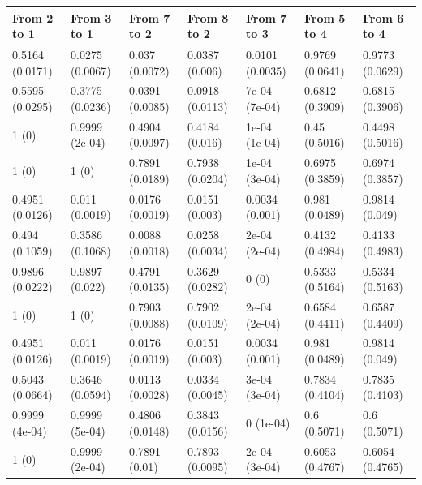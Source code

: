 \documentclass{report}
\begin{document}
\begin{table}[!ht]
	\raggedleft
	\footnotesize
	\begin{tabular}{|l|l|l|l|l|l|l|}
		\arrayrulecolor{black}
		\hline
		\textbf{From 2 to 1} & \textbf{From 3 to 1} & \textbf{From 7 to 2} & \textbf{From 8 to 2} & \textbf{From 7 to 3} & \textbf{From 5 to 4} & \textbf{From 6 to 4} \\ \hline
		\rowcolor{red!10} 0.5164 (0.0171) & 0.0275 (0.0067) & 0.037 (0.0072) & 0.0387 (0.006) & 0.0101 (0.0035) & 0.9769 (0.0641) & 0.9773 (0.0629) \\ \hline
		\rowcolor{red!10}  0.5595 (0.0295) & 0.3775 (0.0236) & 0.0391 (0.0085) & 0.0918 (0.0113) & 7e-04 (7e-04) & 0.6812 (0.3909) & 0.6815 (0.3906) \\ \hline
		\rowcolor{red!10} 1 (0) & 0.9999 (2e-04) & 0.4904 (0.0097) & 0.4184 (0.016) & 1e-04 (1e-04) & 0.45 (0.5016) & 0.4498 (0.5016) \\ \hline
		\rowcolor{red!10} 1 (0) & 1 (0) & 0.7891 (0.0189) & 0.7938 (0.0204) & 1e-04 (3e-04) & 0.6975 (0.3859) & 0.6974 (0.3857) \\ \hline
		\rowcolor{blue!7} 0.4951 (0.0126) & 0.011 (0.0019) & 0.0176 (0.0019) & 0.0151 (0.003) & 0.0034 (0.001) & 0.981 (0.0489) & 0.9814 (0.049) \\ \hline
		\rowcolor{blue!7} 0.494 (0.1059) & 0.3586 (0.1068) & 0.0088 (0.0018) & 0.0258 (0.0034) & 2e-04 (2e-04) & 0.4132 (0.4984) & 0.4133 (0.4983) \\ \hline
		\rowcolor{blue!7} 0.9896 (0.0222) & 0.9897 (0.022) & 0.4791 (0.0135) & 0.3629 (0.0282) & 0 (0) & 0.5333 (0.5164) & 0.5334 (0.5163) \\ \hline
		\rowcolor{blue!7} 1 (0) & 1 (0) & 0.7903 (0.0088) & 0.7902 (0.0109) & 2e-04 (2e-04) & 0.6584 (0.4411) & 0.6587 (0.4409) \\ \hline
		\rowcolor{cyan!10} 0.4951 (0.0126) & 0.011 (0.0019) & 0.0176 (0.0019) & 0.0151 (0.003) & 0.0034 (0.001) & 0.981 (0.0489) & 0.9814 (0.049) \\ \hline
		\rowcolor{cyan!10} 0.5043 (0.0664) & 0.3646 (0.0594) & 0.0113 (0.0028) & 0.0334 (0.0045) & 3e-04 (3e-04) & 0.7834 (0.4104) & 0.7835 (0.4103) \\ \hline
		\rowcolor{cyan!10} 0.9999 (4e-04) & 0.9999 (5e-04) & 0.4806 (0.0148) & 0.3843 (0.0156) & 0 (1e-04) & 0.6 (0.5071) & 0.6 (0.5071) \\ \hline
		\rowcolor{cyan!10} 1 (0) & 0.9999 (2e-04) & 0.7891 (0.01) & 0.7893 (0.0095) & 2e-04 (3e-04) & 0.6053 (0.4767) & 0.6054 (0.4765) \\ \hline

\end{tabular}
\end{table}
\end{document}
